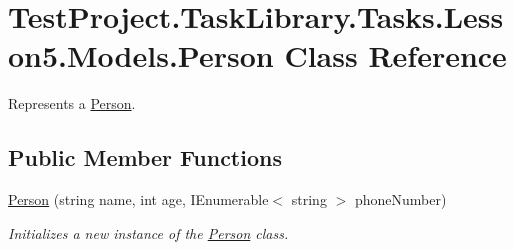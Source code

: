 \hypertarget{class_test_project_1_1_task_library_1_1_tasks_1_1_lesson5_1_1_models_1_1_person}{}\section{Test\+Project.\+Task\+Library.\+Tasks.\+Lesson5.\+Models.\+Person Class Reference}
\label{class_test_project_1_1_task_library_1_1_tasks_1_1_lesson5_1_1_models_1_1_person}


Represents a \mbox{\hyperlink{class_test_project_1_1_task_library_1_1_tasks_1_1_lesson5_1_1_models_1_1_person}{Person}}.  


\subsection*{Public Member Functions}
\begin{DoxyCompactItemize}
\item 
\mbox{\hyperlink{class_test_project_1_1_task_library_1_1_tasks_1_1_lesson5_1_1_models_1_1_person_a8d5529c0719fe3305202e807e0018fbb}{Person}} (string name, int age, I\+Enumerable$<$ string $>$ phone\+Number)
\begin{DoxyCompactList}\small\item\em Initializes a new instance of the \mbox{\hyperlink{class_test_project_1_1_task_library_1_1_tasks_1_1_lesson5_1_1_models_1_1_person}{Person}} class. \end{DoxyCompactList}\end{DoxyCompactItemize}

